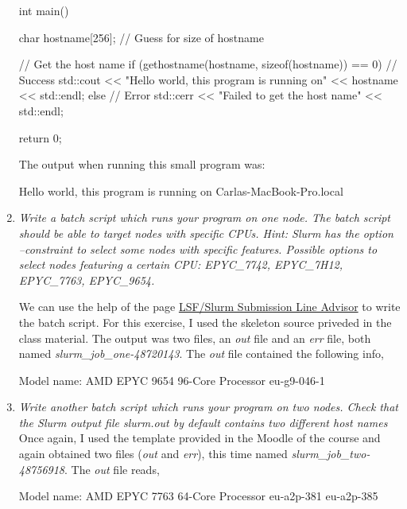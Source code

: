 \documentclass[unicode,11pt,a4paper,oneside,numbers=endperiod,openany]{scrartcl}
\begin{document}
\begin{enumerate}
\begin{cppverbatim}
int main()
{
char hostname[256]; // Guess for size of hostname

// Get the host name
if (gethostname(hostname, sizeof(hostname)) == 0)
{
    // Success
    std::cout << "Hello world, this program is running on" 
    << hostname << std::endl;
}
else
{
    // Error
    std::cerr << "Failed to get the host name" << std::endl;
}

return 0;
}
    \end{cppverbatim}
    The output when running this small program was: 
    \begin{grayverbatim}
Hello world, this program is running on Carlas-MacBook-Pro.local
    \end{grayverbatim}
    
    \item \textit{Write a batch script which runs your program on one node. The batch script should
    be able to target nodes with specific CPUs.
    Hint: Slurm has the option --constraint to select some nodes with specific features. Possible
    options to select nodes featuring a certain CPU: EPYC\_7742, EPYC\_7H12, EPYC\_7763, EPYC\_9654.}

    We can use the help of the page \href{https://scicomp.ethz.ch/public/lsla/index2.html}{LSF/Slurm Submission Line Advisor}
    to write the batch script. For this exercise, I used the skeleton source priveded in the class material.
    The output was two files, an \textit{out} file and an \textit{err} file, both named
    \textit{slurm\_job\_one-48720143}. The \textit{out} file contained the following info,
    \begin{grayverbatim}
Model name:            AMD EPYC 9654 96-Core Processor
eu-g9-046-1
    \end{grayverbatim}    


    \item \textit{Write another batch script which runs your program on two nodes. Check that the
    Slurm output file slurm.out by default contains two different host names}
    Once again, I used the template provided in the Moodle of the course and again obtained
    two files (\textit{out} and \textit{err}), this time named \textit{slurm\_job\_two-48756918}. The \textit{out} file reads,
    \begin{grayverbatim}
Model name:            AMD EPYC 7763 64-Core Processor
eu-a2p-381
eu-a2p-385
    \end{grayverbatim}    


\end{enumerate}
\end{document}
